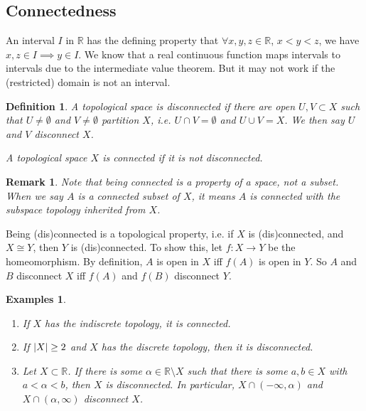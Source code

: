 \documentclass{article}
\theoremstyle{plain}\theoremheaderfont{\normalfont\itshape}\theorembodyfont{\rmfamily}\theoremseparator{.}\newtheorem*{rem}{Remark}\newtheorem*{ex}{Example}\newtheorem*{proof}{Proof}\newtheorem*{altp}{Alternative proof}
\theoremstyle{plain}\theoremheaderfont{\normalfont\bfseries}\theorembodyfont{\rmfamily}\theoremseparator{.}\newtheorem{thm}{Theorem}[section]\newtheorem{lem}[thm]{Lemma}\newtheorem{prop}[thm]{Proposition}\newtheorem*{cor}{Corollary}\newtheorem{defn}[thm]{Definition}\newtheorem{clm}[thm]{Claim}\newtheorem{clminproof}{Claim}
\theoremstyle{break}\theoremheaderfont{\normalfont\itshape}\theorembodyfont{\rmfamily}\theoremseparator{.\medskip}\newtheorem*{proofskip}{Proof}\newtheorem*{exs}{Examples}\newtheorem*{rems}{Remarks}
\theoremstyle{break}\theoremheaderfont{\normalfont\bfseries}\theorembodyfont{\rmfamily}\theoremseparator{.\medskip}\newtheorem{lemskip}[thm]{Lemma}\newtheorem{defnskip}[thm]{Definition}\newtheorem{propskip}[thm]{Proposition}\newtheorem{thmskip}[thm]{Theorem}
\begin{document}
    \subsection{Connectedness}
    An interval \(I\) in \(\mathbb{R}\) has the defining property that \(\forall x,y,z\in\mathbb{R}\), \(x<y<z\), we have \(x,z\in I\implies y\in I\). We know that a real continuous function maps intervals to intervals due to the intermediate value theorem. But it may not work if the (restricted) domain is not an interval.
    \begin{defn}
        A topological space is \textit{disconnected} if there are open \(U,V\subset X\) such that \(U\ne\emptyset\) and \(V\ne\emptyset\) partition \(X\), i.e. \(U\cap V=\emptyset\) and \(U\cup V=X\). We then say \(U\) and \(V\) \textit{disconnect} \(X\).

        A topological space \(X\) is \textit{connected} if it is not disconnected.
    \end{defn}
    \begin{rem}
        Note that being connected is a property of a space, not a subset. When we say \(A\) is a connected subset of \(X\), it means \(A\) is connected with the subspace topology inherited from \(X\).
    \end{rem}

    Being (dis)connected is a topological property, i.e. if \(X\) is (dis)connected, and \(X\cong Y\), then \(Y\) is (dis)connected. To show this, let \(f:X\to Y\) be the homeomorphism. By definition, \(A\) is open in \(X\) iff \(f(A)\) is open in \(Y\). So \(A\) and \(B\) disconnect \(X\) iff \(f(A)\) and \(f(B)\) disconnect \(Y\).

    \begin{exs}
        \begin{enumerate}[label=(\roman*),topsep=0pt]
            \item If \(X\) has the indiscrete topology, it is connected.
            \item If \(\abs{X}\ge 2\) and \(X\) has the discrete topology, then it is disconnected.
            \item Let \(X\subset\mathbb{R}\). If there is some \(\alpha\in\mathbb{R}\setminus X\) such that there is some \(a,b\in X\) with \(a<\alpha<b\), then \(X\) is disconnected. In particular, \(X\cap(-\infty,\alpha)\) and \(X\cap(\alpha,\infty)\) disconnect \(X\).
        \end{enumerate}
    \end{exs}
\end{document}
